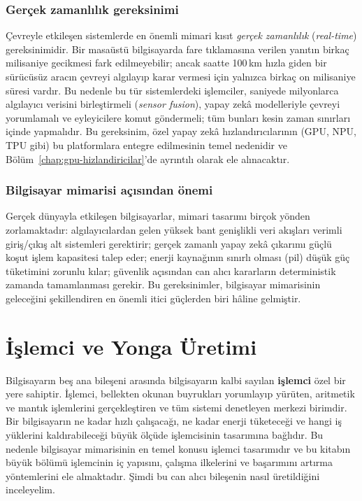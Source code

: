 \subsubsection*{Gerçek zamanlılık gereksinimi}
Çevreyle etkileşen sistemlerde en önemli mimari kısıt \emph{gerçek zamanlılık} (\emph{real-time}) gereksinimidir. Bir masaüstü bilgisayarda fare tıklamasına verilen yanıtın birkaç milisaniye gecikmesi fark edilmeyebilir; ancak saatte 100\,km hızla giden bir sürücüsüz aracın çevreyi algılayıp karar vermesi için yalnızca birkaç on milisaniye süresi vardır. Bu nedenle bu tür sistemlerdeki işlemciler, saniyede milyonlarca algılayıcı verisini birleştirmeli (\emph{sensor fusion}), yapay zekâ modelleriyle çevreyi yorumlamalı ve eyleyicilere komut göndermeli; tüm bunları kesin zaman sınırları içinde yapmalıdır. Bu gereksinim, özel yapay zekâ hızlandırıcılarının (GPU, NPU, TPU gibi) bu platformlara entegre edilmesinin temel nedenidir ve Bölüm~\ref{chap:gpu-hizlandiricilar}'de ayrıntılı olarak ele alınacaktır.

\subsubsection*{Bilgisayar mimarisi açısından önemi}
Gerçek dünyayla etkileşen bilgisayarlar, mimari tasarımı birçok yönden zorlamaktadır: algılayıcılardan gelen yüksek bant genişlikli veri akışları verimli giriş/çıkış alt sistemleri gerektirir; gerçek zamanlı yapay zekâ çıkarımı güçlü koşut işlem kapasitesi talep eder; enerji kaynağının sınırlı olması (pil) düşük güç tüketimini zorunlu kılar; güvenlik açısından can alıcı kararların deterministik zamanda tamamlanması gerekir. Bu gereksinimler, bilgisayar mimarisinin geleceğini şekillendiren en önemli itici güçlerden biri hâline gelmiştir.


\section{İşlemci ve Yonga Üretimi}
\label{sec:islemci}

Bilgisayarın beş ana bileşeni arasında bilgisayarın kalbi sayılan \textbf{işlemci} özel bir yere sahiptir. İşlemci, bellekten okunan buyrukları yorumlayıp yürüten, aritmetik ve mantık işlemlerini gerçekleştiren ve tüm sistemi denetleyen merkezi birimdir. Bir bilgisayarın ne kadar hızlı çalışacağı, ne kadar enerji tüketeceği ve hangi iş yüklerini kaldırabileceği büyük ölçüde işlemcisinin tasarımına bağlıdır. Bu nedenle bilgisayar mimarisinin en temel konusu işlemci tasarımıdır ve bu kitabın büyük bölümü işlemcinin iç yapısını, çalışma ilkelerini ve başarımını artırma yöntemlerini ele almaktadır. Şimdi bu can alıcı bileşenin nasıl üretildiğini inceleyelim.

